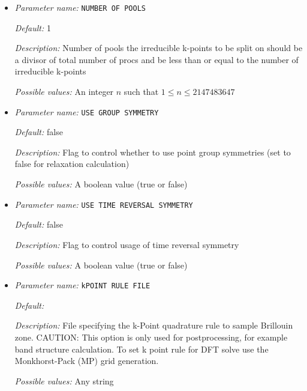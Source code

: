 \begin{itemize}
\item {\it Parameter name:} {\tt NUMBER OF POOLS}
\label{parameters:Brillouin zone k point sampling options/NUMBER OF POOLS}
\label{parameters:Brillouin_20zone_20k_20point_20sampling_20options/NUMBER_20OF_20POOLS}


{\it Default:} 1


{\it Description:} Number of pools the irreducible k-points to be split on should be a divisor of total number of procs and be less than or equal to the number of irreducible k-points


{\it Possible values:} An integer $n$ such that $1\leq n \leq 2147483647$
\item {\it Parameter name:} {\tt USE GROUP SYMMETRY}
\label{parameters:Brillouin zone k point sampling options/USE GROUP SYMMETRY}
\label{parameters:Brillouin_20zone_20k_20point_20sampling_20options/USE_20GROUP_20SYMMETRY}


{\it Default:} false


{\it Description:} Flag to control whether to use point group symmetries (set to false for relaxation calculation)


{\it Possible values:} A boolean value (true or false)
\item {\it Parameter name:} {\tt USE TIME REVERSAL SYMMETRY}
\label{parameters:Brillouin zone k point sampling options/USE TIME REVERSAL SYMMETRY}
\label{parameters:Brillouin_20zone_20k_20point_20sampling_20options/USE_20TIME_20REVERSAL_20SYMMETRY}


{\it Default:} false


{\it Description:} Flag to control usage of time reversal symmetry 


{\it Possible values:} A boolean value (true or false)
\item {\it Parameter name:} {\tt kPOINT RULE FILE}
\label{parameters:Brillouin zone k point sampling options/kPOINT RULE FILE}
\label{parameters:Brillouin_20zone_20k_20point_20sampling_20options/kPOINT_20RULE_20FILE}


{\it Default:} 


{\it Description:} File specifying the k-Point quadrature rule to sample Brillouin zone. CAUTION: This option is only used for postprocessing, for example band structure calculation. To set k point rule for DFT solve use the Monkhorst-Pack (MP) grid generation.


{\it Possible values:} Any string
\end{itemize}



